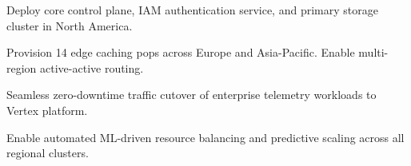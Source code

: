 \documentclass[landscape,20pt]{foils}
\begin{document}
\foilhead{\textcolor{NavyDark}{\faTasks\ Global Rollout Timeline}}
\vspace{2pt}
\begin{minipage}[t]{0.48\textwidth}
  \begin{tcolorbox}[slidecard, title=\large Phase 1: Core Foundation (Q1 2026)]
    Deploy core control plane, IAM authentication service, and primary storage cluster in North America.
  \end{tcolorbox}
  \vspace{4pt}
  \begin{tcolorbox}[slidecard, title=\large Phase 2: Edge Expansion (Q2 2026)]
    Provision 14 edge caching pops across Europe and Asia-Pacific. Enable multi-region active-active routing.
  \end{tcolorbox}
\end{minipage}%
\hfill
\begin{minipage}[t]{0.48\textwidth}
  \begin{tcolorbox}[slidecard, title=\large Phase 3: Workload Migration (Q3 2026)]
    Seamless zero-downtime traffic cutover of enterprise telemetry workloads to Vertex platform.
  \end{tcolorbox}
  \vspace{4pt}
  \begin{tcolorbox}[slidecard, title=\large Phase 4: Full Autonomy (Q4 2026)]
    Enable automated ML-driven resource balancing and predictive scaling across all regional clusters.
  \end{tcolorbox}
\end{minipage}
\end{document}
